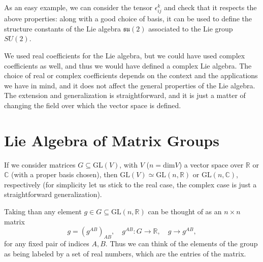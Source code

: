 As an easy example, we can consider the tensor \(\epsilon_{ij}^k\) and check that it respects the above properties: along with a good choice of basis, it can be used to define the structure constants of the Lie algebra \(\mathfrak{su}(2)\) associated to the Lie group \(SU(2)\).

We used real coefficients for the Lie algebra, but we could have used complex coefficients as well, and thus we would have defined a complex Lie algebra. The choice of real or complex coefficients depends on the context and the applications we have in mind, and it does not affect the general properties of the Lie algebra. The extension and generalization is straightforward, and it is just a matter of changing the field over which the vector space is defined.

\section{Lie Algebra of Matrix Groups}

If we consider matrices \(G \subseteq \mathrm{GL}(V)\), with \(V\) (\(n = \text{dim}V\)) a vector space over \(\mathbb{R}\) or \(\mathbb{C}\) (with a proper basis chosen), then \(\mathrm{GL}(V) \simeq \mathrm{GL}(n, \mathbb{R})\) or \(\mathrm{GL}(n, \mathbb{C})\), respectively (for simplicity let us stick to the real case, the complex case is just a straightforward generalization).

Taking than any element \(g \in G \subseteq \mathrm{GL}(n, \mathbb{R})\) can be thought of as an \(n \times n\) matrix
\[
    g = (g^{AB})_{AB}, \quad g^{AB} : G \to \mathbb{R}, \quad g \to g^{AB},
\]
for any fixed pair of indices \(A,B\). Thus we can think of the elements of the group as being labeled by a set of real numbers, which are the entries of the matrix.

